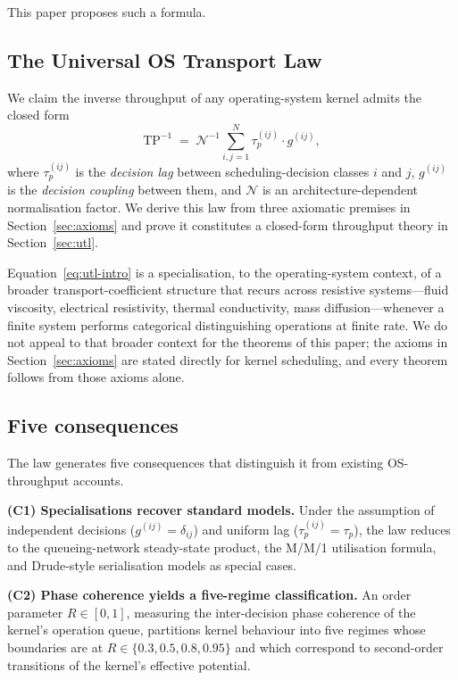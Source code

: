 \documentclass[twocolumn,11pt,a4paper]{article}
\newcommand{\TP}{\mathrm{TP}}
\newcommand{\taup}{\tau_p}
\newcommand{\Norm}{\mathcal{N}}
\newcommand{\Rens}{R}
\begin{document}
This paper proposes such a formula.

\subsection{The Universal OS Transport Law}

We claim the inverse throughput of any operating-system kernel admits the closed form
\begin{equation}
\TP^{-1} \;=\; \Norm^{-1}\sum_{i,j=1}^{N} \taup^{(ij)} \cdot g^{(ij)},
\label{eq:utl-intro}
\end{equation}
where $\taup^{(ij)}$ is the \emph{decision lag} between scheduling-decision classes $i$ and $j$, $g^{(ij)}$ is the \emph{decision coupling} between them, and $\Norm$ is an architecture-dependent normalisation factor. We derive this law from three axiomatic premises in Section~\ref{sec:axioms} and prove it constitutes a closed-form throughput theory in Section~\ref{sec:utl}.

Equation~\eqref{eq:utl-intro} is a specialisation, to the operating-system context, of a broader transport-coefficient structure that recurs across resistive systems---fluid viscosity, electrical resistivity, thermal conductivity, mass diffusion---whenever a finite system performs categorical distinguishing operations at finite rate. We do not appeal to that broader context for the theorems of this paper; the axioms in Section~\ref{sec:axioms} are stated directly for kernel scheduling, and every theorem follows from those axioms alone.

\subsection{Five consequences}

The law generates five consequences that distinguish it from existing OS-throughput accounts.

\textbf{(C1) Specialisations recover standard models.} Under the assumption of independent decisions ($g^{(ij)} = \delta_{ij}$) and uniform lag ($\taup^{(ij)} = \taup$), the law reduces to the queueing-network steady-state product, the M/M/1 utilisation formula, and Drude-style serialisation models as special cases.

\textbf{(C2) Phase coherence yields a five-regime classification.} An order parameter $\Rens \in [0,1]$, measuring the inter-decision phase coherence of the kernel's operation queue, partitions kernel behaviour into five regimes whose boundaries are at $\Rens \in \{0.3, 0.5, 0.8, 0.95\}$ and which correspond to second-order transitions of the kernel's effective potential.
\end{document}
